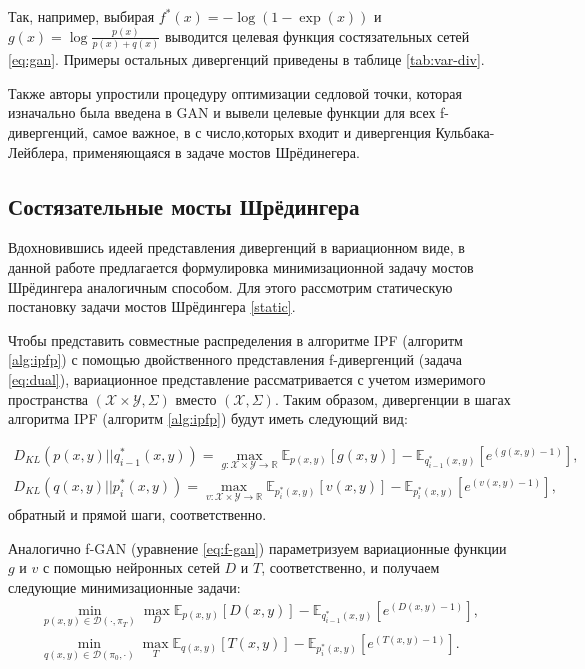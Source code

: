 Так, например, выбирая $f^*(x) = - \log(1 - \exp(x))$ и $g(x) = \log \frac{p(x)}{p(x)+q(x)}$ выводится целевая функция состязательных сетей \ref{eq:gan}. Примеры остальных дивергенций приведены в таблице \ref{tab:var-div}.

Также авторы упростили процедуру оптимизации седловой точки, которая изначально была введена в GAN и вывели целевые функции для всех f-дивергенций, самое важное, в с число,которых входит и дивергенция Кульбака-Лейблера, применяющаяся в задаче мостов Шрёдинегера.

\subsection{Состязательные мосты Шрёдингера}
Вдохновившись идеей представления дивергенций в вариационном виде, в данной работе предлагается формулировка минимизационной задачу мостов Шрёдингера аналогичным способом. Для этого рассмотрим статическую постановку задачи мостов Шрёдингера \ref{static}. 

Чтобы представить совместные распределения в алгоритме IPF (алгоритм \ref{alg:ipfp}) с помощью двойственного представления f-дивергенций (задача \ref{eq:dual}), вариационное представление рассматривается с учетом измеримого пространства $(\mathcal{X}\times\mathcal{Y}, \Sigma)$ вместо $(\mathcal {X}, \Sigma)$. Таким образом, дивергенции в шагах алгоритма IPF (алгоритм \ref{alg:ipfp}) будут иметь следующий вид:

\begin{equation}
    \begin{split}
        D_{KL}(p(x,y)||q^*_{i-1}(x,y)) = \max_{g:\mathcal{X}\times\mathcal{Y} \rightarrow \mathbb{R}} \mathbb{E}_{p(x,y)}[g(x,y)] - \mathbb{E}_{q^*_{i-1}(x,y)}\left[e^{(g(x,y) - 1)}\right], \\
        D_{KL}(q(x,y)||p^*_{i}(x,y)) = \max_{v:\mathcal{X}\times\mathcal{Y} \rightarrow \mathbb{R}} \mathbb{E}_{p^*_{i}(x,y)}[v(x,y)] - \mathbb{E}_{p^*_{i}(x,y)}\left[e^{(v(x,y) - 1)}\right],
    \end{split}
\end{equation}
обратный и прямой шаги, соответственно.

Аналогично f-GAN (уравнение \ref{eq:f-gan}) параметризуем вариационные функции $g$ и $v$ с помощью нейронных сетей $D$ и $T$, соответственно, и получаем следующие минимизационные задачи:
\begin{equation}
    \begin{split}
        \min_{p(x,y) \in \mathcal{D}(\cdot, \pi_T)}\max_{D}\mathbb{E}_{p(x,y)}[D(x,y)] - \mathbb{E}_{q^*_{i-1}(x,y)}\left[e^{(D(x,y) - 1)}\right], \\
        \min_{q(x,y) \in \mathcal{D}(\pi_0, \cdot)}\max_{T}\mathbb{E}_{q(x,y)}[T(x,y)] - \mathbb{E}_{p^*_{i}(x,y)}\left[e^{(T(x,y) - 1)}\right].
    \end{split}
\end{equation}

